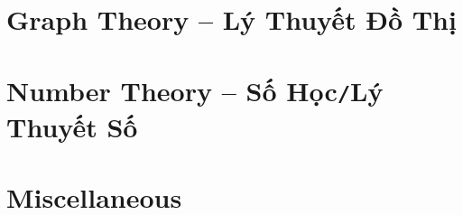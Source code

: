 \documentclass{article}
\begin{document}

\section{Graph Theory -- Lý Thuyết Đồ Thị}


\section{Number Theory -- Số Học{\tt/}Lý Thuyết Số}



\section{Miscellaneous}


\printbibliography[heading=bibintoc]
	
\end{document}
